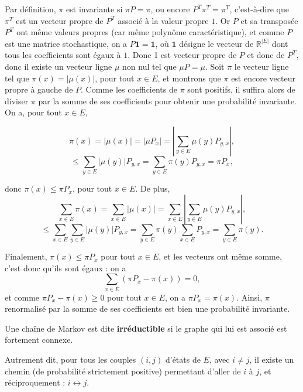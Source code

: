 \documentclass{article}
\begin{document}
\begin{tcolorbox}[colback=white,colframe=green!80!black,title=Démonstration, breakable]
Par définition, $\pi$ est invariante si $\pi P = \pi$, ou encore $P^T \pi^T = \pi^T$, c'est-à-dire que $\pi^T$ est un vecteur propre de $P^T$ associé à la valeur propre $1$.
Or $P$ et sa transposée $P^T$ ont même valeurs propres (car même polynôme caractéristique), et comme $P$ est une matrice stochastique, on a $P \mathbf{1} = \mathbf{1}$, où $\mathbf{1}$ désigne le vecteur de $\mathbb{R}^{|E|}$ dont tous les coefficients sont égaux à $1$.
Donc 1 est vecteur propre de $P$ et donc de $P^T$, donc il existe un vecteur ligne $\mu$ non nul tel que $\mu P = \mu$. Soit $\pi$ le vecteur ligne tel que $\pi(x) = |\mu(x)|$, pour tout $x \in E$, et montrons que $\pi$ est encore vecteur propre à gauche de $P$.
Comme les coefficients de $\pi$ sont positifs, il suffira alors de diviser $\pi$ par la somme de ses coefficients pour obtenir une probabilité invariante. On a, pour tout $x \in E$,

\[
\pi(x) = |\mu(x)| = |\mu P_x| = \left| \sum_{y \in E} \mu(y) P_{y,x} \right|,
\]
\[
\leq \sum_{y \in E} |\mu(y)| P_{y,x} = \sum_{y \in E} \pi(y) P_{y,x} = \pi P_x,
\]

donc $\pi(x) \leq \pi P_x$, pour tout $x \in E$. De plus,
\[
\sum_{x \in E} \pi(x) = \sum_{x \in E} |\mu(x)| = \sum_{x \in E} \left| \sum_{y \in E} \mu(y) P_{y,x} \right|,
\]
\[
\leq \sum_{x \in E} \sum_{y \in E} |\mu(y)| P_{y,x} = \sum_{y \in E} \pi(y) \sum_{x \in E} P_{y,x} = \sum_{y \in E} \pi(y).
\]

Finalement, $\pi(x) \leq \pi P_x$ pour tout $x \in E$, et les vecteurs ont même somme, c’est donc qu’ils sont égaux : on a
\[
\sum_{x \in E} (\pi P_x - \pi(x)) = 0,
\]
et comme $\pi P_x - \pi(x) \geq 0$ pour tout $x \in E$, on a $\pi P_x = \pi(x)$. Ainsi, $\pi$ renormalisé par la somme de ses coefficients est bien une probabilité invariante.
\end{tcolorbox}
  

\begin{tcolorbox}[colback=white,colframe=blue!80!black,title=Chaîne de Markov irréductible]
Une chaîne de Markov est dite \textbf{irréductible} si le graphe qui lui est associé est fortement connexe.

Autrement dit, pour tous les couples $(i, j)$ d'états de $E$, avec $i \neq j$, il existe un chemin (de probabilité strictement positive) permettant d'aller de $i$ à $j$, et réciproquement : $i \leftrightarrow j$.
\end{tcolorbox}
\end{document}
